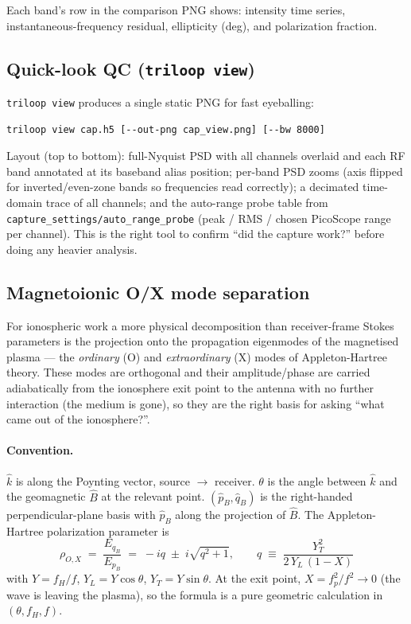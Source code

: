 \documentclass[11pt]{article}
\begin{document}
Each band's row in the comparison PNG shows: intensity time series,
instantaneous-frequency residual, ellipticity (deg), and polarization
fraction.

\subsection{Quick-look QC (\texttt{triloop view})}
\label{sec:view}

\texttt{triloop view} produces a single static PNG for fast eyeballing:

\begin{lstlisting}[style=shell]
triloop view cap.h5 [--out-png cap_view.png] [--bw 8000]
\end{lstlisting}

Layout (top to bottom): full-Nyquist PSD with all channels overlaid and
each RF band annotated at its baseband alias position; per-band PSD
zooms (axis flipped for inverted/even-zone bands so frequencies read
correctly); a decimated time-domain trace of all channels; and the
auto-range probe table from
\texttt{capture\_settings/auto\_range\_probe} (peak / RMS / chosen
PicoScope range per channel).  This is the right tool to confirm
``did the capture work?'' before doing any heavier analysis.

\subsection{Magnetoionic O/X mode separation}
\label{sec:magnetoionic}

For ionospheric work a more physical decomposition than receiver-frame
Stokes parameters is the projection onto the propagation eigenmodes of
the magnetised plasma --- the \emph{ordinary} (O) and \emph{extraordinary}
(X) modes of Appleton-Hartree theory.  These modes are orthogonal and
their amplitude/phase are carried adiabatically from the ionosphere
exit point to the antenna with no further interaction (the medium is
gone), so they are the right basis for asking ``what came out of the
ionosphere?''.

\paragraph{Convention.} $\hat k$ is along the Poynting vector,
source $\to$ receiver.  $\theta$ is the angle between $\hat k$ and the
geomagnetic $\hat B$ at the relevant point.  $(\hat p_B, \hat q_B)$ is
the right-handed perpendicular-plane basis with $\hat p_B$ along the
projection of $\hat B$.  The Appleton-Hartree polarization parameter is
\[
\rho_{O,X}\;=\;\frac{E_{q_B}}{E_{p_B}}\;=\;-iq\;\pm\;i\sqrt{q^2+1},
\qquad q\;\equiv\;\frac{Y_T^2}{2\,Y_L\,(1-X)}
\]
with $Y = f_H/f$, $Y_L = Y\cos\theta$, $Y_T = Y\sin\theta$.  At the
exit point, $X = f_p^2/f^2 \to 0$ (the wave is leaving the plasma),
so the formula is a pure geometric calculation in $(\theta, f_H, f)$.
\end{document}
